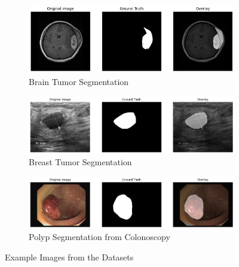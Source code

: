 \begin{figure}[]
    \centering
    \begin{subfigure}{1\textwidth}
        \centering
        \includegraphics[width=\linewidth]{images/bts1.png}
        \caption{Brain Tumor Segmentation}
        \label{fig:bts1}
    \end{subfigure}

    \vspace{1em}
    
    \begin{subfigure}{1\textwidth}
        \centering
        \includegraphics[width=\linewidth]{images/busi1.png}
        \caption{Breast Tumor Segmentation}
        \label{fig:busi1}
    \end{subfigure}

    \vspace{1em}  %

    \begin{subfigure}{1\textwidth}
        \centering
        \includegraphics[width=\linewidth]{images/cvc1.png}
        \caption{Polyp Segmentation from Colonoscopy}
        \label{fig:cvc1}
    \end{subfigure}
    \caption{Example Images from the Datasets}
    \label{fig:combined}
\end{figure}


